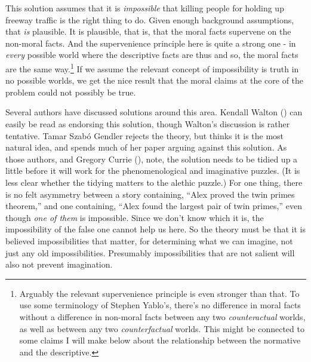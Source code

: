 \documentclass[
  11pt,
  letterpaper,
  DIV=11,
  numbers=noendperiod,
  twoside]{scrartcl}
\begin{document}
This solution assumes that it is \emph{impossible} that killing people
for holding up freeway traffic is the right thing to do. Given enough
background assumptions, that \emph{is} plausible. It is plausible, that
is, that the moral facts supervene on the non-moral facts. And the
supervenience principle here is quite a strong one - in \emph{every}
possible world where the descriptive facts are thus and so, the moral
facts are the same way.\footnote{Arguably the relevant supervenience
  principle is even stronger than that. To use some terminology of
  Stephen Yablo's, there's no difference in moral facts without a
  difference in non-moral facts between any two \emph{counteractual}
  worlds, as well as between any two \emph{counterfactual} worlds. This
  might be connected to some claims I will make below about the
  relationship between the normative and the descriptive.} If we assume
the relevant concept of impossibility is truth in no possible worlds, we
get the nice result that the moral claims at the core of the problem
could not possibly be true.

Several authors have discussed solutions around this area. Kendall
Walton () can easily be read as endorsing
this solution, though Walton's discussion is rather tentative. Tamar
Szabó Gendler rejects the theory, but thinks it is the most natural
idea, and spends much of her paper arguing against this solution. As
those authors, and Gregory Currie (),
note, the solution needs to be tidied up a little before it will work
for the phenomenological and imaginative puzzles. (It is less clear
whether the tidying matters to the alethic puzzle.) For one thing, there
is no felt asymmetry between a story containing, ``Alex proved the twin
primes theorem,'' and one containing, ``Alex found the largest pair of
twin primes,'' even though \emph{one of them} is impossible. Since we
don't know which it is, the impossibility of the false one cannot help
us here. So the theory must be that it is believed impossibilities that
matter, for determining what we can imagine, not just any old
impossibilities. Presumably impossibilities that are not salient will
also not prevent imagination.
\end{document}
